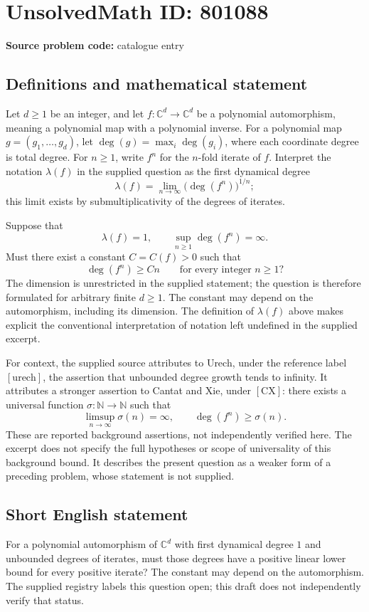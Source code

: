 \documentclass[11pt]{article}
\newcommand{\N}{\mathbb{N}}
\newcommand{\C}{\mathbb{C}}
\begin{document}
\section*{UnsolvedMath ID: 801088}
\textbf{Source problem code:} catalogue entry
\subsection{Definitions and mathematical statement}
Let \(d\geq 1\) be an integer, and let \(f\colon\C^d\to\C^d\) be a polynomial automorphism, meaning a polynomial map with a polynomial inverse. For a polynomial map \(g=(g_1,\ldots,g_d)\), let \(\deg(g)=\max_i\deg(g_i)\), where each coordinate degree is total degree. For \(n\geq 1\), write \(f^n\) for the \(n\)-fold iterate of \(f\). Interpret the notation \(\lambda(f)\) in the supplied question as the first dynamical degree
\[
\lambda(f)=\lim_{n\to\infty}\bigl(\deg(f^n)\bigr)^{1/n};
\]
this limit exists by submultiplicativity of the degrees of iterates.

Suppose that
\[
\lambda(f)=1,
\qquad
\sup_{n\geq 1}\deg(f^n)=\infty.
\]
Must there exist a constant \(C=C(f)>0\) such that
\[
\deg(f^n)\geq Cn\qquad\text{for every integer }n\geq 1?
\]
The dimension is unrestricted in the supplied statement; the question is therefore formulated for arbitrary finite \(d\geq 1\). The constant may depend on the automorphism, including its dimension. The definition of \(\lambda(f)\) above makes explicit the conventional interpretation of notation left undefined in the supplied excerpt.

For context, the supplied source attributes to Urech, under the reference label \([\mathrm{urech}]\), the assertion that unbounded degree growth tends to infinity. It attributes a stronger assertion to Cantat and Xie, under \([\mathrm{CX}]\): there exists a universal function \(\sigma\colon\N\to\N\) such that
\[
\limsup_{n\to\infty}\sigma(n)=\infty,
\qquad
\deg(f^n)\geq\sigma(n).
\]
These are reported background assertions, not independently verified here. The excerpt does not specify the full hypotheses or scope of universality of this background bound. It describes the present question as a weaker form of a preceding problem, whose statement is not supplied.
\subsection{Short English statement}
For a polynomial automorphism of \(\C^d\) with first dynamical degree \(1\) and unbounded degrees of iterates, must those degrees have a positive linear lower bound for every positive iterate? The constant may depend on the automorphism. The supplied registry labels this question open; this draft does not independently verify that status.
\end{document}
